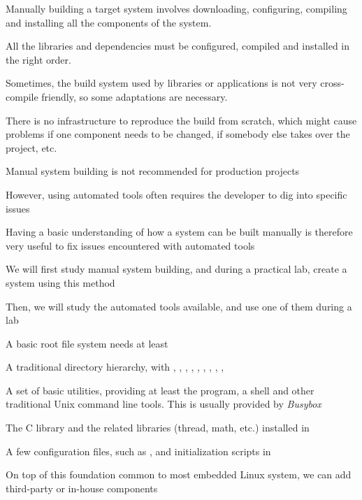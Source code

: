   \startitemize
  \item Manually building a target system involves downloading,
    configuring, compiling and installing all the components of the
    system.
  \item All the libraries and dependencies must be configured,
    compiled and installed in the right order.
  \item Sometimes, the build system used by libraries or applications
    is not very cross-compile friendly, so some adaptations are
    necessary.
  \item There is no infrastructure to reproduce the build from
    scratch, which might cause problems if one component needs to be
    changed, if somebody else takes over the project, etc.
  \stopitemize

  \startitemize
  \item Manual system building is not recommended for production
    projects
  \item However, using automated tools often requires the developer to
    dig into specific issues
  \item Having a basic understanding of how a system can be built
    manually is therefore very useful to fix issues encountered with
    automated tools
    \startitemize
    \item We will first study manual system building, and during a
      practical lab, create a system using this method
    \item Then, we will study the automated tools available, and use
      one of them during a lab
    \stopitemize
  \stopitemize

  \startitemize
  \item A basic root file system needs at least
    \startitemize
    \item A traditional directory hierarchy, with ,
      , , , ,
      , , ,
      , 
    \item A set of basic utilities, providing at least the 
      program, a shell and other traditional Unix command line
      tools. This is usually provided by {\em Busybox}
    \item The C library and the related libraries (thread, math, etc.)
      installed in 
    \item A few configuration files, such as , and
      initialization scripts in 
    \stopitemize
  \item On top of this foundation common to most embedded Linux
    system, we can add third-party or in-house components
  \stopitemize

